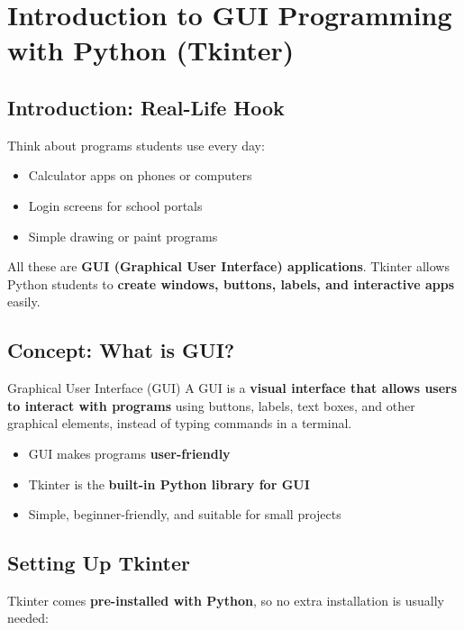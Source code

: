 \chapter{Introduction to GUI Programming with Python (Tkinter)}

\section{Introduction: Real-Life Hook}

Think about programs students use every day:

\begin{itemize}
    \item Calculator apps on phones or computers  
    \item Login screens for school portals  
    \item Simple drawing or paint programs  
\end{itemize}

All these are \textbf{GUI (Graphical User Interface) applications}. Tkinter allows Python students to \textbf{create windows, buttons, labels, and interactive apps} easily.

\section{Concept: What is GUI?}

\begin{definition}{Graphical User Interface (GUI)}
A GUI is a \textbf{visual interface that allows users to interact with programs} using buttons, labels, text boxes, and other graphical elements, instead of typing commands in a terminal.
\end{definition}

\begin{itemize}
    \item GUI makes programs \textbf{user-friendly}  
    \item Tkinter is the \textbf{built-in Python library for GUI}  
    \item Simple, beginner-friendly, and suitable for small projects  
\end{itemize}

\section{Setting Up Tkinter}

Tkinter comes \textbf{pre-installed with Python}, so no extra installation is usually needed:

